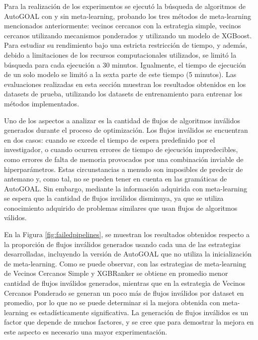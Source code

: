 Para la realización de los experimentos se ejecutó la búsqueda de algoritmos de AutoGOAL con y sin meta-learning, probando los tres métodos de meta-learning mencionados anteriormente: vecinos cercanos con la estrategia simple, vecinos cercanos utilizando mecanismos ponderados y utilizando un modelo de XGBoost. Para estudiar su rendimiento bajo una estricta restricción de tiempo, y además, debido a limitaciones de los recursos computacionales utilizados, se limitó la búsqueda para cada ejecución a 30 minutos. Igualmente, el tiempo de ejecución de un solo modelo se limitó a la sexta parte de este tiempo (5 minutos). Las evaluaciones realizadas en esta sección muestran los resultados obtenidos en los datasets de prueba, utilizando los datasets de entrenamiento para entrenar los métodos implementados. %

Uno de los aspectos a analizar es la cantidad de flujos de algoritmos inválidos generados durante el proceso de optimización. Los flujos inválidos se encuentran en dos casos: cuando se excede el tiempo de espera predefinido por el investigador, o cuando ocurren errores de tiempo de ejecución impredecibles, como errores de falta de memoria provocados por una combinación inviable de hiperparámetros. Estas circunstancias a menudo son imposibles de predecir de antemano y, como tal, no se pueden tener en cuenta en las gramáticas de AutoGOAL. Sin embargo, mediante la información adquirida con meta-learning se espera que la cantidad de flujos inválidos disminuya, ya que se utiliza conocimiento adquirido de problemas similares que usan flujos de algoritmos válidos.

En la Figura \ref{fig:failedpipelines}, se muestran los resultados obtenidos respecto a la proporción de flujos inválidos generados usando cada una de las estrategias desarrolladas, incluyendo la versión de AutoGOAL que no utiliza la inicialización de meta-learning. Como se puede observar, con las estrategias de meta-learning de Vecinos Cercanos Simple y XGBRanker se obtiene en promedio menor cantidad de flujos inválidos generados, mientras que en la estrategia de Vecinos Cercanos Ponderado se generan un poco más de flujos inválidos por dataset en promedio, por lo que no se puede determinar si la mejora obtenida con meta-learning es estadísticamente significativa. La generación de flujos inválidos es un factor que depende de muchos factores, y se cree que para demostrar la mejora en este aspecto es necesario una mayor experimentación.

